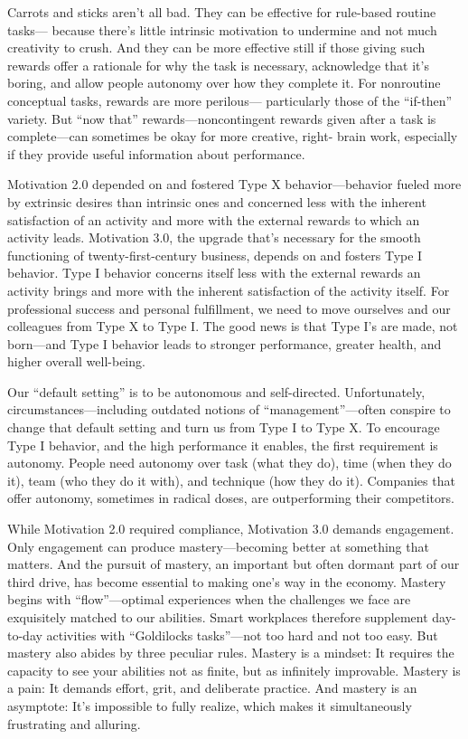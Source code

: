 Carrots and sticks aren’t all bad. They can be effective for rule-based routine tasks— because there’s little intrinsic motivation to undermine and not much creativity to crush. And they can be more effective still if those giving such rewards offer a rationale for why the task is necessary, acknowledge that it’s boring, and allow people autonomy over how they complete it. For nonroutine conceptual tasks, rewards are more perilous— particularly those of the “if-then” variety. But “now that” rewards—noncontingent rewards given after a task is complete—can sometimes be okay for more creative, right- brain work, especially if they provide useful information about performance.


Motivation 2.0 depended on and fostered Type X behavior—behavior fueled more by extrinsic desires than intrinsic ones and concerned less with the inherent satisfaction of an activity and more with the external rewards to which an activity leads. Motivation 3.0, the upgrade that’s necessary for the smooth functioning of twenty-first-century business, depends on and fosters Type I behavior. Type I behavior concerns itself less with the external rewards an activity brings and more with the inherent satisfaction of the activity itself. For professional success and personal fulfillment, we need to move ourselves and our colleagues from Type X to Type I. The good news is that Type I’s are made, not born—and Type I behavior leads to stronger performance, greater health, and higher overall well-being.

Our “default setting” is to be autonomous and self-directed. Unfortunately, circumstances—including outdated notions of “management”—often conspire to change that default setting and turn us from Type I to Type X. To encourage Type I behavior, and the high performance it enables, the first requirement is autonomy. People need autonomy over task (what they do), time (when they do it), team (who they do it with), and technique (how they do it). Companies that offer autonomy, sometimes in radical doses, are outperforming their competitors.

While Motivation 2.0 required compliance, Motivation 3.0 demands engagement. Only engagement can produce mastery—becoming better at something that matters. And the pursuit of mastery, an important but often dormant part of our third drive, has become essential to making one’s way in the economy. Mastery begins with “flow”—optimal experiences when the challenges we face are exquisitely matched to our abilities. Smart workplaces therefore supplement day-to-day activities with “Goldilocks tasks”—not too hard and not too easy. But mastery also abides by three peculiar rules. Mastery is a mindset: It requires the capacity to see your abilities not as finite, but as infinitely improvable. Mastery is a pain: It demands effort, grit, and deliberate practice. And mastery is an asymptote: It’s impossible to fully realize, which makes it simultaneously frustrating and alluring.


